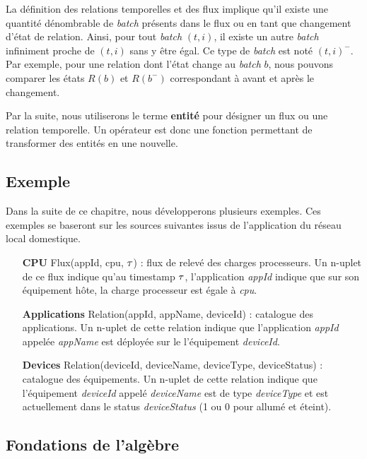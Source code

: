 La définition des relations temporelles et des flux implique qu'il existe une quantité dénombrable de \textit{batch} présents dans le flux ou en tant que changement d'état de relation. Ainsi, pour tout \textit{batch} $(t,i)$, il existe un autre \textit{batch} infiniment proche de $(t,i)$ sans y être égal. Ce type de \textit{batch} est noté $(t,i)^-$. Par exemple, pour une relation dont l'état change au \textit{batch} $b$, nous pouvons comparer les états $R(b)$ et $R(b^-)$ correspondant à avant et après le changement.

Par la suite, nous utiliserons le terme \textbf{entité} pour désigner un flux ou une relation temporelle. Un opérateur est donc une fonction permettant de transformer des entités en une nouvelle.
\subsection{Exemple}
Dans la suite de ce chapitre, nous développerons plusieurs exemples. Ces exemples se baseront sur les sources suivantes issus de l'application du réseau local domestique.
\begin{itemize}
    \item[\textbf{CPU}] Flux(appId, cpu, $\tau$) : flux de relevé des charges processeurs. Un n-uplet de ce flux indique qu'au timestamp $\tau$, l'application \textit{appId} indique que sur son équipement hôte, la charge processeur est égale à \textit{cpu}.
    \item[\textbf{Applications}] Relation(appId, appName, deviceId) : catalogue des applications. Un n-uplet de cette relation indique que l'application \textit{appId} appelée \textit{appName} est déployée sur le l'équipement \textit{deviceId}.
    \item[\textbf{Devices}] Relation(deviceId, deviceName, deviceType, deviceStatus) : catalogue des équipements. Un n-uplet de cette relation indique que l'équipement \textit{deviceId} appelé \textit{deviceName} est de type \textit{deviceType} et est actuellement dans le status \textit{deviceStatus} (1 ou 0 pour allumé et éteint).
\end{itemize}

\subsection{Fondations de l'algèbre}
